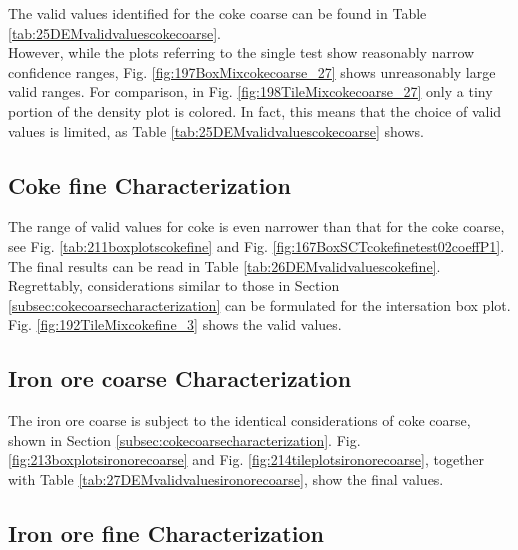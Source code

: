 The valid values identified for the coke coarse can be found in Table
\ref{tab:25DEMvalidvaluescokecoarse}.\\
However, while the plots referring to the single test show reasonably narrow
confidence ranges, Fig. \ref{fig:197BoxMixcokecoarse_27} shows unreasonably
large valid ranges.
For comparison, in Fig. \ref{fig:198TileMixcokecoarse_27} only a tiny portion of
the density plot is colored.
In fact, this means that the choice of valid values is limited, as Table
\ref{tab:25DEMvalidvaluescokecoarse} shows.





\subsection{Coke fine Characterization}
\label{subsec:cokefinecharacterization}

The range of valid values for coke is even narrower than that for the coke
coarse, see Fig. \ref{tab:211boxplotscokefine} and
Fig. \ref{fig:167BoxSCTcokefinetest02coeffP1}.
The final results can be read in Table \ref{tab:26DEMvalidvaluescokefine}.\\
Regrettably, considerations similar to those in Section
\ref{subsec:cokecoarsecharacterization} can be formulated for the intersation
box plot.
Fig. \ref{fig:192TileMixcokefine_3} shows the valid values.






\subsection{Iron ore coarse Characterization}
\label{subsec:ironorecoarsecharacterization}

The iron ore coarse is subject to the identical considerations of coke coarse,
shown in Section \ref{subsec:cokecoarsecharacterization}.
Fig. \ref{fig:213boxplotsironorecoarse} and Fig.
\ref{fig:214tileplotsironorecoarse}, together with Table
\ref{tab:27DEMvalidvaluesironorecoarse}, show the final values.






\subsection{Iron ore fine Characterization}
\label{subsec:ironorefinecharacterization}

